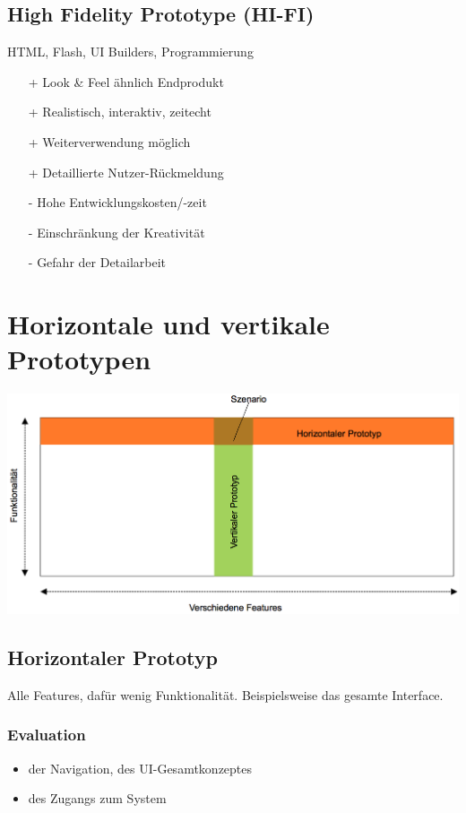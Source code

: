 \documentclass[a4paper,10pt]{article}
\begin{document}
\subsection{High Fidelity Prototype (HI-FI)}
HTML, Flash, UI Builders, Programmierung 
\begin{itemize}
	\item[+] Look \& Feel \"ahnlich Endprodukt
	\item[+] Realistisch, interaktiv, zeitecht
	\item[+] Weiterverwendung m\"oglich
	\item[+] Detaillierte Nutzer-R\"uckmeldung
	\item[-] Hohe Entwicklungskosten/-zeit
	\item[-] Einschr\"ankung der Kreativit\"at
	\item[-] Gefahr der Detailarbeit
\end{itemize}

\section{Horizontale und vertikale Prototypen}

\includegraphics[scale=0.4]{horizontale_vertikale_prototypen.png}

\subsection{Horizontaler Prototyp}
Alle Features, daf\"ur wenig Funktionalit\"at. Beispielsweise das gesamte Interface.

\subsubsection{Evaluation}
\begin{itemize}
	\item der Navigation, des UI-Gesamtkonzeptes
	\item des Zugangs zum System
\end{itemize}
\end{document}
